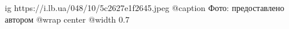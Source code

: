  
 
 
 
 

\ifcmt
  ig https://i.lb.ua/048/10/5c2627e1f2645.jpeg
	@caption Фото: предоставлено автором
  @wrap center
  @width 0.7
\fi
